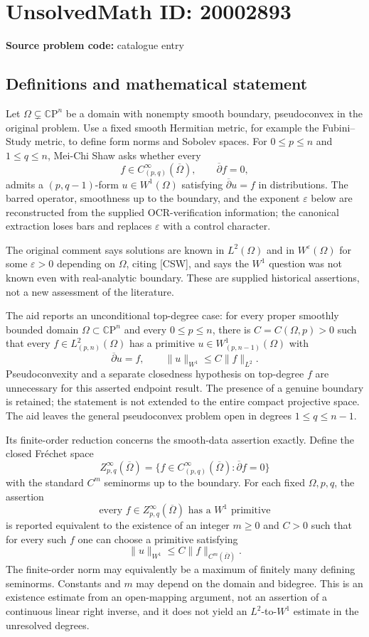 \documentclass[11pt]{article}
\newcommand{\C}{\mathbb{C}}
\newcommand{\eps}{\varepsilon}
\begin{document}
\section*{UnsolvedMath ID: 20002893}
\textbf{Source problem code:} catalogue entry
\subsection{Definitions and mathematical statement}
Let $\Omega\subsetneq\C\mathrm P^n$ be a domain with nonempty smooth boundary, pseudoconvex in the original problem. Use a fixed smooth Hermitian metric, for example the Fubini--Study metric, to define form norms and Sobolev spaces. For $0\leq p\leq n$ and $1\leq q\leq n$, Mei-Chi Shaw asks whether every
\[
f\in C^\infty_{(p,q)}(\overline\Omega),\qquad\overline\partial f=0,
\]
admits a $(p,q-1)$-form $u\in W^1(\Omega)$ satisfying $\overline\partial u=f$ in distributions. The barred operator, smoothness up to the boundary, and the exponent $\eps$ below are reconstructed from the supplied OCR-verification information; the canonical extraction loses bars and replaces $\eps$ with a control character.

The original comment says solutions are known in $L^2(\Omega)$ and in $W^\eps(\Omega)$ for some $\eps>0$ depending on $\Omega$, citing [CSW], and says the $W^1$ question was not known even with real-analytic boundary. These are supplied historical assertions, not a new assessment of the literature.

The aid reports an unconditional top-degree case: for every proper smoothly bounded domain $\Omega\subset\C\mathrm P^n$ and every $0\leq p\leq n$, there is $C=C(\Omega,p)>0$ such that every $f\in L^2_{(p,n)}(\Omega)$ has a primitive $u\in W^1_{(p,n-1)}(\Omega)$ with
\[
\overline\partial u=f,\qquad\|u\|_{W^1}\leq C\|f\|_{L^2}.
\]
Pseudoconvexity and a separate closedness hypothesis on top-degree $f$ are unnecessary for this asserted endpoint result. The presence of a genuine boundary is retained; the statement is not extended to the entire compact projective space. The aid leaves the general pseudoconvex problem open in degrees $1\leq q\leq n-1$.

Its finite-order reduction concerns the smooth-data assertion exactly. Define the closed Fr\'echet space
\[
Z^\infty_{p,q}(\overline\Omega)=\{f\in C^\infty_{(p,q)}(\overline\Omega):\overline\partial f=0\}
\]
with the standard $C^m$ seminorms up to the boundary. For each fixed $\Omega,p,q$, the assertion
\[
\text{every }f\in Z^\infty_{p,q}(\overline\Omega)\text{ has a }W^1\text{ primitive}
\]
is reported equivalent to the existence of an integer $m\geq0$ and $C>0$ such that for every such $f$ one can choose a primitive satisfying
\[
\|u\|_{W^1}\leq C\|f\|_{C^m(\overline\Omega)}.
\]
The finite-order norm may equivalently be a maximum of finitely many defining seminorms. Constants and $m$ may depend on the domain and bidegree. This is an existence estimate from an open-mapping argument, not an assertion of a continuous linear right inverse, and it does not yield an $L^2$-to-$W^1$ estimate in the unresolved degrees.
\end{document}
